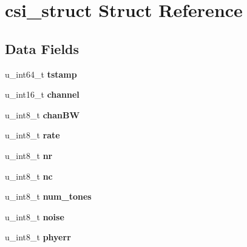 \hypertarget{structcsi__struct}{\section{csi\+\_\+struct Struct Reference}
\label{structcsi__struct}
}
\subsection*{Data Fields}
\begin{DoxyCompactItemize}
\item 
\hypertarget{structcsi__struct_ac8ba20371dcdbdaeb85058f52ab3d868}{u\+\_\+int64\+\_\+t {\bfseries tstamp}}\label{structcsi__struct_ac8ba20371dcdbdaeb85058f52ab3d868}

\item 
\hypertarget{structcsi__struct_a61377724eca873f2240d9f783d2ba80b}{u\+\_\+int16\+\_\+t {\bfseries channel}}\label{structcsi__struct_a61377724eca873f2240d9f783d2ba80b}

\item 
\hypertarget{structcsi__struct_abbc6e4ea7e5715a804eb2dfd69cad603}{u\+\_\+int8\+\_\+t {\bfseries chan\+B\+W}}\label{structcsi__struct_abbc6e4ea7e5715a804eb2dfd69cad603}

\item 
\hypertarget{structcsi__struct_aaf5f341137b331e43bdbd8280f15d719}{u\+\_\+int8\+\_\+t {\bfseries rate}}\label{structcsi__struct_aaf5f341137b331e43bdbd8280f15d719}

\item 
\hypertarget{structcsi__struct_ad92ff4c838d8dc100865d28a0a802859}{u\+\_\+int8\+\_\+t {\bfseries nr}}\label{structcsi__struct_ad92ff4c838d8dc100865d28a0a802859}

\item 
\hypertarget{structcsi__struct_a7bc84a2f75977e4713d1ea09c1a9ca96}{u\+\_\+int8\+\_\+t {\bfseries nc}}\label{structcsi__struct_a7bc84a2f75977e4713d1ea09c1a9ca96}

\item 
\hypertarget{structcsi__struct_a553110c0bd159611593a51c3ae3fb2d2}{u\+\_\+int8\+\_\+t {\bfseries num\+\_\+tones}}\label{structcsi__struct_a553110c0bd159611593a51c3ae3fb2d2}

\item 
\hypertarget{structcsi__struct_acaa5ab531a3289b359b0af50478329ce}{u\+\_\+int8\+\_\+t {\bfseries noise}}\label{structcsi__struct_acaa5ab531a3289b359b0af50478329ce}

\item 
\hypertarget{structcsi__struct_aa6638fbb247fe3630300e4283e0f34f2}{u\+\_\+int8\+\_\+t {\bfseries phyerr}}\label{structcsi__struct_aa6638fbb247fe3630300e4283e0f34f2}


\end{DoxyCompactItemize}
